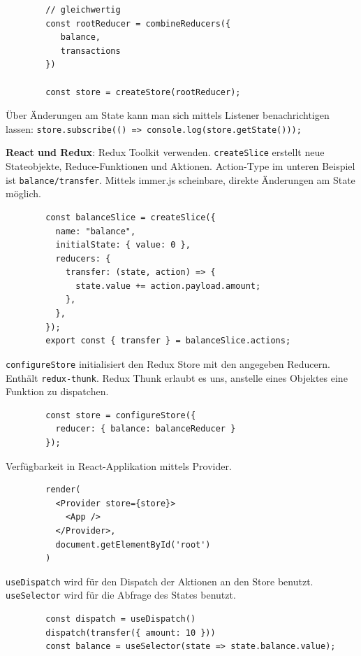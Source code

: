 \documentclass[10pt,landscape]{article}
\begin{document}
\begin{multicols}{3}
\begin{lstlisting}
        // gleichwertig
        const rootReducer = combineReducers({
           balance,
           transactions
        })

        const store = createStore(rootReducer);
        \end{lstlisting}

        Über Änderungen am State kann man sich mittels Listener benachrichtigen lassen: \lstinline{store.subscribe(() => console.log(store.getState()));}

        \textbf{React und Redux}: Redux Toolkit verwenden.
        \lstinline{createSlice} erstellt neue Stateobjekte, Reduce-Funktionen und Aktionen.
        Action-Type im unteren Beispiel ist \lstinline{balance/transfer}.
        Mittels immer.js scheinbare, direkte Änderungen am State möglich.

        \begin{lstlisting}
        const balanceSlice = createSlice({
          name: "balance",
          initialState: { value: 0 },
          reducers: {
            transfer: (state, action) => {
              state.value += action.payload.amount;
            },
          },
        });
        export const { transfer } = balanceSlice.actions;
        \end{lstlisting}

        \lstinline{configureStore} initialisiert den Redux Store mit den angegeben Reducern.
        Enthält \lstinline{redux-thunk}.
        Redux Thunk erlaubt es uns, anstelle eines Objektes eine Funktion zu dispatchen.

        \begin{lstlisting}
        const store = configureStore({
          reducer: { balance: balanceReducer }
        });
        \end{lstlisting}

        Verfügbarkeit in React-Applikation mittels Provider.

        \begin{lstlisting}
        render(
          <Provider store={store}>
            <App />
          </Provider>,
          document.getElementById('root')
        )
        \end{lstlisting}

        \lstinline{useDispatch} wird für den Dispatch der Aktionen an den Store benutzt.
        \lstinline{useSelector} wird für die Abfrage des States benutzt.

        \begin{lstlisting}
        const dispatch = useDispatch()
        dispatch(transfer({ amount: 10 }))
        const balance = useSelector(state => state.balance.value);
        \end{lstlisting}


\end{multicols}
\end{document}
